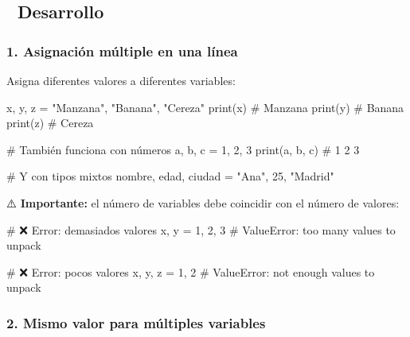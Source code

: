 \documentclass[
  doc,
  floatsintext,
  longtable,
  a4paper,
  nolmodern,
  notxfonts,
  notimes,
  12pt,
  colorlinks=true,linkcolor=blue,citecolor=blue,urlcolor=blue]{apa7}
\newenvironment{Shaded}{\begin{snugshade}}{\end{snugshade}}
\newcommand{\BuiltInTok}[1]{\textcolor[rgb]{0.00,0.23,0.31}{#1}}
\newcommand{\CommentTok}[1]{\textcolor[rgb]{0.37,0.37,0.37}{#1}}
\newcommand{\DecValTok}[1]{\textcolor[rgb]{0.68,0.00,0.00}{#1}}
\newcommand{\NormalTok}[1]{\textcolor[rgb]{0.00,0.23,0.31}{#1}}
\newcommand{\OperatorTok}[1]{\textcolor[rgb]{0.37,0.37,0.37}{#1}}
\newcommand{\StringTok}[1]{\textcolor[rgb]{0.13,0.47,0.30}{#1}}
\begin{document}
\subsection{📐 Desarrollo}\label{desarrollo}

\subsubsection{1. Asignación múltiple en una
línea}\label{asignaciuxf3n-muxfaltiple-en-una-luxednea}

Asigna diferentes valores a diferentes variables:

\begin{Shaded}
\begin{Highlighting}[]
\NormalTok{x, y, z }\OperatorTok{=} \StringTok{"Manzana"}\NormalTok{, }\StringTok{"Banana"}\NormalTok{, }\StringTok{"Cereza"}
\BuiltInTok{print}\NormalTok{(x)  }\CommentTok{\# Manzana}
\BuiltInTok{print}\NormalTok{(y)  }\CommentTok{\# Banana}
\BuiltInTok{print}\NormalTok{(z)  }\CommentTok{\# Cereza}

\CommentTok{\# También funciona con números}
\NormalTok{a, b, c }\OperatorTok{=} \DecValTok{1}\NormalTok{, }\DecValTok{2}\NormalTok{, }\DecValTok{3}
\BuiltInTok{print}\NormalTok{(a, b, c)  }\CommentTok{\# 1 2 3}

\CommentTok{\# Y con tipos mixtos}
\NormalTok{nombre, edad, ciudad }\OperatorTok{=} \StringTok{"Ana"}\NormalTok{, }\DecValTok{25}\NormalTok{, }\StringTok{"Madrid"}
\end{Highlighting}
\end{Shaded}

⚠️ \textbf{Importante:} el número de variables debe coincidir con el
número de valores:

\begin{Shaded}
\begin{Highlighting}[]
\CommentTok{\# ❌ Error: demasiados valores}
\NormalTok{x, y }\OperatorTok{=} \DecValTok{1}\NormalTok{, }\DecValTok{2}\NormalTok{, }\DecValTok{3}  \CommentTok{\# ValueError: too many values to unpack}

\CommentTok{\# ❌ Error: pocos valores}
\NormalTok{x, y, z }\OperatorTok{=} \DecValTok{1}\NormalTok{, }\DecValTok{2}  \CommentTok{\# ValueError: not enough values to unpack}
\end{Highlighting}
\end{Shaded}

\subsubsection{2. Mismo valor para múltiples
variables}\label{mismo-valor-para-muxfaltiples-variables}
\end{document}
